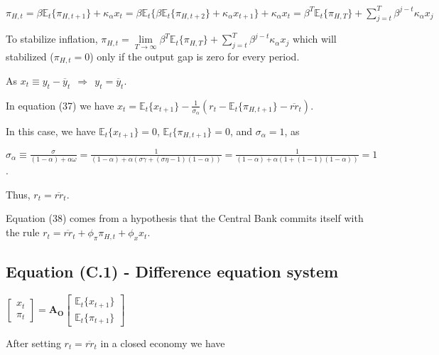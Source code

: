 \documentclass[
]{article}
\begin{document}
\(\displaystyle \pi_{H,t}=\beta \mathbb{E}_t\{ \pi_{H,t+1} \}+ \kappa_\alpha x_t = \beta \mathbb{E}_t\{ \beta \mathbb{E}_t \{ \pi_{H,t+2} \}+ \kappa_\alpha x_{t+1}\}+ \kappa_\alpha x_t=\beta^T \mathbb{E}_t\{\pi_{H,T}\} + \sum_{j=t}^T \beta^{j-t}\kappa_\alpha x_j\)

To stabilize inflation,
\(\displaystyle \pi_{H,t} =\underset{T \rightarrow \infty} \lim\beta^T \mathbb{E}_t\{\pi_{H,T}\} + \sum_{j=t}^T \beta^{j-t}\kappa_\alpha x_j\)
which will stabilized (\(\pi_{H,t}=0\)) only if the output gap is zero
for every period.

As
\(x_t \equiv y_t-\overline{y}_t \ \ \Rightarrow \ \ y_t=\overline{y}_t\).

In equation (37) we have
\(\displaystyle x_t = \mathbb{E}_t\{x_{t+1}\} -\frac{1}{\sigma_\alpha}(r_t-\mathbb{E}_t\{\pi_{H,t+1}\} -\overline{rr}_t)\).

In this case, we have \(\mathbb{E}_t\{x_{t+1}\}=0\),
\(\mathbb{E}_t\{\pi_{H,t+1}\}=0\), and \(\sigma_\alpha=1\), as

\(\displaystyle \sigma_\alpha \equiv \frac{\sigma}{(1-\alpha)+\alpha \omega}=\frac{1}{(1-\alpha)+\alpha (\sigma \gamma+(\sigma \eta -1 )(1-\alpha))}=\frac{1}{(1-\alpha)+\alpha (1+(1 -1 )(1-\alpha))}=1\).

Thus, \(r_t=\overline{rr}_t\).

Equation (38) comes from a hypothesis that the Central Bank commits
itself with the rule
\(r_t=\overline{rr}_t+\phi_\pi \pi_{H,t}+\phi_x x_t\).

\vspace{12pt}

\hypertarget{equation-c.1---difference-equation-system}{%
\subsection{Equation (C.1) - Difference equation
system}\label{equation-c.1---difference-equation-system}}

\(\displaystyle \left[ \begin{matrix} x_t\\ \pi_t \end{matrix} \right] =\mathbf{A_O} \left[ \begin{matrix} \mathbb{E}_t\{x_{t+1} \}\\ \mathbb{E}_t \{\pi_{t+1} \} \end{matrix} \right]\)

\vspace{8pt}

After setting \(r_t=\overline{rr}_t\) in a closed economy we have
\end{document}
